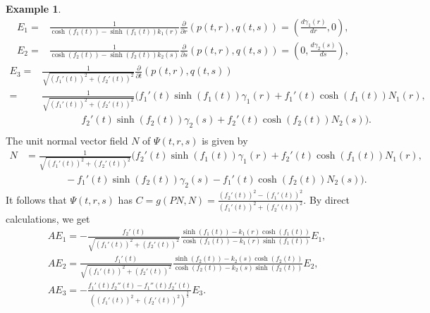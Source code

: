 \documentclass[reqno]{amsart}%
\theoremstyle{definition}
\newtheorem{example}[theorem]{Example}
\numberwithin{equation}{section}
\begin{document}
\begin{example}
\begin{equation*}
\begin{aligned}
E_1=&\frac{1}{\cosh(f_1(t))-\sinh(f_1(t))k_1(r)}
\frac{\partial}{\partial r}(p(t,r),q(t,s))
=(\frac{d\gamma_1(r)}{dr},0),\\
E_2=&\frac{1}{\cosh(f_2(t))-\sinh(f_2(t))k_2(s)}
\frac{\partial }{\partial s}(p(t,r),q(t,s))
=(0,\frac{d\gamma_2(s)}{ds}),
\end{aligned}	
\end{equation*}
\begin{equation*}
\begin{aligned}
E_3=&\frac{1}{\sqrt{(f_1'(t))^2+(f_2'(t))^2}}\frac{\partial}{\partial t}(p(t,r),q(t,s))\\
=&\frac{1}{\sqrt{(f_1'(t))^2+(f_2'(t))^2}}(f_1'(t)\sinh(f_1(t))\gamma_1(r)
+f_1'(t)\cosh(f_1(t))N_1(r),\\
&\qquad\qquad  f_2'(t)\sinh(f_2(t))\gamma_2(s)
+f_2'(t)\cosh(f_2(t))N_2(s)).\\
\end{aligned}	
\end{equation*}
The unit normal vector field $N$ of $\Psi(t,r,s)$ is given by
\begin{equation}\label{eqn:3.3ss1}
\begin{aligned}
N&=\frac{1}{\sqrt{(f_1'(t))^2+(f_2'(t))^2}}(f_2'(t)\sinh(f_1(t))\gamma_1(r)
+f_2'(t)\cosh(f_1(t))N_1(r),\\
&\qquad \qquad -f_1'(t)\sinh(f_2(t))\gamma_2(s)
-f_1'(t)\cosh(f_2(t))N_2(s)).
\end{aligned}
\end{equation}
It follows that $\Psi(t,r,s)$ has $C=g(PN,N)=\frac{(f_2'(t))^2-(f_1'(t))^2}{(f_1'(t))^2+(f_2'(t))^2}$.
By direct calculations, we get
\begin{equation}\label{eqn:3.4ss1}
\begin{aligned}
&AE_1=-\frac{f_2'(t)}{\sqrt{(f_1'(t))^2+(f_2'(t))^2}}\frac{\sinh(f_1(t))-k_1(r)\cosh(f_1(t))}
{\cosh(f_1(t))-k_1(r)\sinh(f_1(t))}E_1,\\
&AE_2=\frac{f_1'(t)}{\sqrt{(f_1'(t))^2+(f_2'(t))^2}}\frac{\sinh(f_2(t))-k_2(s)\cosh(f_2(t))}
{\cosh(f_2(t))-k_2(s)\sinh(f_2(t))}E_2,\\
&AE_3=-\frac{f_1'(t)f_2''(t)-f_1''(t)f_2'(t)}{((f_1'(t))^2+(f_2'(t))^2)^{\frac{3}{2}}}E_3.
\end{aligned}
\end{equation}
\end{example}
\end{document}
